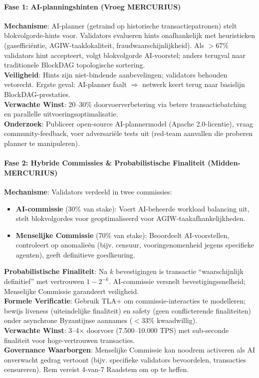 \documentclass[11pt]{article}
\begin{document}
\paragraph{Fase 1: AI-planningshinten (Vroeg MERCURIUS)}
\textbf{Mechanisme}: AI-planner (getraind op historische transactiepatronen) stelt blokvolgorde-hints voor. Validators evalueren hints onafhankelijk met heuristieken (gasefficiëntie, AGIW-taaklokaliteit, fraudwaarschijnlijkheid). Als $>67\%$ validators hint accepteert, volgt blokvolgorde AI-voorstel; anders terugval naar traditionele BlockDAG topologische sortering.\\
\textbf{Veiligheid}: Hints zijn niet-bindende aanbevelingen; validators behouden vetorecht. Ergste geval: AI-planner faalt $\Rightarrow$ netwerk keert terug naar basislijn BlockDAG-prestaties.\\
\textbf{Verwachte Winst}: 20--30\% doorvoerverbetering via betere transactiebatching en parallelle uitvoeringsoptimalisatie.\\
\textbf{Onderzoek}: Publiceer open-source AI-plannermodel (Apache 2.0-licentie), vraag community-feedback, voer adversariële tests uit (red-team aanvallen die proberen planner te manipuleren).

\paragraph{Fase 2: Hybride Commissies \& Probabilistische Finaliteit (Midden-MERCURIUS)}
\textbf{Mechanisme}: Validators verdeeld in twee commissies:
\begin{itemize}[noitemsep]
  \item \textbf{AI-commissie} (30\% van stake): Voert AI-beheerde workload balancing uit, stelt blokvolgordes voor geoptimaliseerd voor AGIW-taakafhankelijkheden.
  \item \textbf{Menselijke Commissie} (70\% van stake): Beoordeelt AI-voorstellen, controleert op anomalieën (bijv. censuur, vooringenomenheid jegens specifieke agenten), geeft definitieve goedkeuring.
\end{itemize}
\textbf{Probabilistische Finaliteit}: Na $k$ bevestigingen is transactie ``waarschijnlijk definitief'' met vertrouwen $1 - 2^{-k}$. AI-commissie versnelt bevestigingssnelheid; Menselijke Commissie garandeert veiligheid.\\
\textbf{Formele Verificatie}: Gebruik TLA+ om commissie-interacties te modelleren; bewijs liveness (uiteindelijke finaliteit) en safety (geen conflicterende finaliteiten) onder asynchrone Byzantijnse aannames ($<33\%$ kwaadwillig).\\
\textbf{Verwachte Winst}: 3--4$\times$ doorvoer (7.500--10.000 TPS) met sub-seconde finaliteit voor hoge-vertrouwen transacties.\\
\textbf{Governance Waarborgen}: Menselijke Commissie kan noodrem activeren als AI onverwacht gedrag vertoont (bijv. specifieke validators bevoordelen, transacties censureren). Rem vereist 4-van-7 Raadstem om op te heffen.
\end{document}
